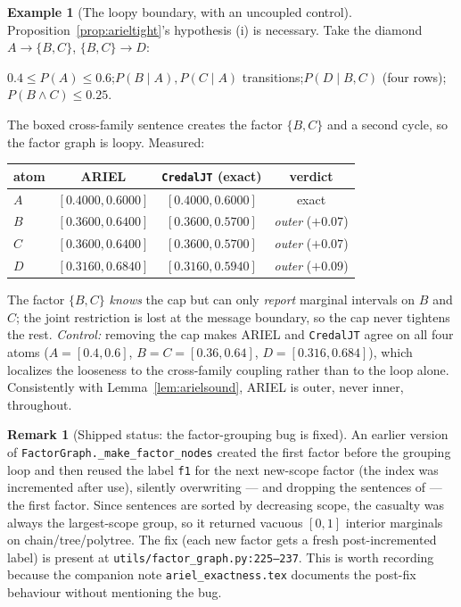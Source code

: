 \documentclass[11pt]{article}
\theoremstyle{definition}
\newtheorem{example}{Example}
\newtheorem{remark}{Remark}
\begin{document}
\begin{example}[The loopy boundary, with an uncoupled control]\label{ex:diamond}
Proposition~\ref{prop:arieltight}'s hypothesis (i) is necessary. Take the diamond
$A\to\{B,C\}$, $\{B,C\}\to D$:
\begin{center}\small
$0.4\le P(A)\le0.6$;\quad $P(B\mid A),P(C\mid A)$ transitions;\quad $P(D\mid B,C)$ (four rows);\quad
$\boxed{P(B\wedge C)\le0.25}$.
\end{center}
The boxed cross-family sentence creates the factor $\{B,C\}$ and a second cycle, so the factor graph is
loopy. Measured:
\begin{center}\small
\begin{tabular}{@{}lccc@{}}
\toprule
atom & ARIEL & \texttt{CredalJT} (exact) & verdict\\
\midrule
$A$ & $[0.4000,0.6000]$ & $[0.4000,0.6000]$ & exact\\
$B$ & $[0.3600,\mathbf{0.6400}]$ & $[0.3600,\mathbf{0.5700}]$ & \emph{outer} ($+0.07$)\\
$C$ & $[0.3600,\mathbf{0.6400}]$ & $[0.3600,\mathbf{0.5700}]$ & \emph{outer} ($+0.07$)\\
$D$ & $[0.3160,\mathbf{0.6840}]$ & $[0.3160,\mathbf{0.5940}]$ & \emph{outer} ($+0.09$)\\
\bottomrule
\end{tabular}
\end{center}
The factor $\{B,C\}$ \emph{knows} the cap but can only \emph{report} marginal intervals on $B$ and
$C$; the joint restriction is lost at the message boundary, so the cap never tightens the rest.
\emph{Control:} removing the cap makes ARIEL and \texttt{CredalJT} agree on all four atoms
($A=[0.4,0.6]$, $B=C=[0.36,0.64]$, $D=[0.316,0.684]$), which localizes the looseness to the
cross-family coupling rather than to the loop alone. Consistently with
Lemma~\ref{lem:arielsound}, ARIEL is outer, never inner, throughout.
\end{example}

\begin{remark}[Shipped status: the factor-grouping bug is fixed]\label{rem:arielbug}
An earlier version of \texttt{FactorGraph.\_make\_\allowbreak factor\_nodes} created the first
factor before the grouping loop and then reused the label \texttt{f1} for the next new-scope factor
(the index was incremented after use), silently overwriting --- and dropping the sentences of --- the
first factor. Since sentences are sorted by decreasing scope, the casualty was always the
largest-scope group, so it returned vacuous $[0,1]$ interior marginals on chain/tree/polytree. The fix (each new factor gets a
fresh post-incremented label) is present at \texttt{utils/factor\_graph.py:225--237}. This is worth
recording because the companion note \texttt{ariel\_exactness.tex} documents the post-fix behaviour
without mentioning the bug.
\end{remark}
\end{document}
